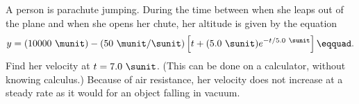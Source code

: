 A person is parachute jumping.  During the time between
when she leaps out of the plane and when she opens her
chute, her altitude is given by the equation
\begin{equation*}
        y = (10000\ \munit) - (50\ \munit/\sunit)\left[t+(5.0\ \sunit)e^{-t/5.0\ \sunit}\right]\eqquad.
\end{equation*}
Find her velocity at $t=7.0\ \sunit$.  (This can be done on a
calculator, without knowing calculus.) Because of air
resistance, her velocity does not increase at a steady rate
as it would for an object falling in vacuum. \answercheck
